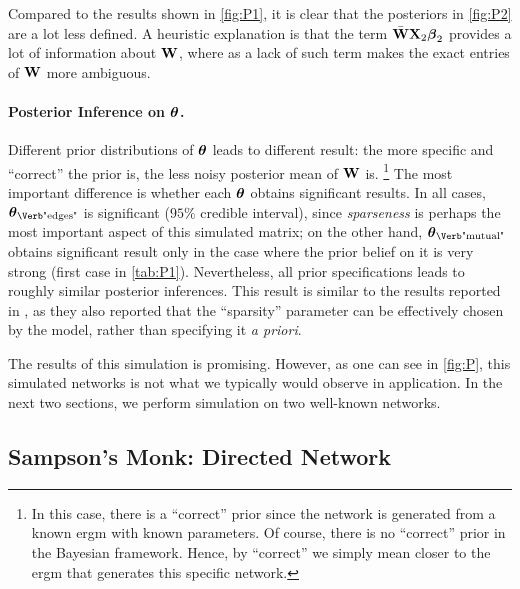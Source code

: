 \documentclass[a4paper]{article}
\begin{document}
Compared to the results shown in \autoref{fig:P1},
it is clear that the posteriors in \autoref{fig:P2} are a lot less defined.
A heuristic explanation is that the term $\bar{\mathbf{W}}\mathbf{X}_2\boldsymbol{\beta}_2$ provides a lot of information about $\mathbf{W}$,
where as a lack of such term makes the exact entries of $\mathbf{W}$ more ambiguous.

\paragraph{Posterior Inference on $\boldsymbol{\theta}$.}

Different prior distributions of $\boldsymbol{\theta}$ leads to different result:
the more specific and ``correct'' the prior is, the less noisy posterior mean of $\mathbf{W}$ is.
\footnote{
	In this case,
	there is a ``correct'' prior since the network is generated from a known \gls{ergm} with known parameters.
	Of course, there is no ``correct'' prior in the Bayesian framework.
	Hence, by ``correct'' we simply mean closer to the \gls{ergm} that generates this specific network.
}
The most important difference is whether each $\boldsymbol{\theta}$ obtains significant results.
In all cases, $\ttheta_{\text{\Verb"edges"}}$ is significant ($95\%$ credible interval),
since \emph{sparseness} is perhaps the most important aspect of this simulated matrix;
on the other hand,
$\ttheta_{\text{\Verb"mutual"}}$ obtains significant result
only in the case where the prior belief on it is very strong (first case in \autoref{tab:P1}).
Nevertheless, all prior specifications leads to roughly similar posterior inferences.
This result is similar to the results reported in \cite{krisztin-piribauer-2022},
as they also reported that the ``sparsity'' parameter can be effectively chosen by the model,
rather than specifying it \emph{a priori}.

\dinkus

The results of this simulation is promising.
However, as one can see in \autoref{fig:P},
this simulated networks is not what we typically would observe in application.
In the next two sections, we perform simulation on two well-known networks.

\subsection{Sampson's Monk: Directed Network}\label{subsec:S}
\end{document}
